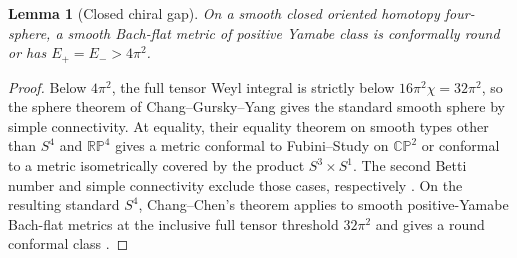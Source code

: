 \documentclass[11pt]{article}
\newtheorem{lemma}[theorem]{Lemma}
\theoremstyle{definition}
\theoremstyle{remark}
\begin{document}
\begin{lemma}[Closed chiral gap]\label{lem:closed-gap}
On a smooth closed oriented homotopy four-sphere, a smooth Bach-flat metric of positive Yamabe class is conformally round or has \(E_+=E_->4\pi^2\).
\end{lemma}
\begin{proof}
Below \(4\pi^2\), the full tensor Weyl integral is strictly below \(16\pi^2\chi=32\pi^2\), so the sphere theorem of Chang--Gursky--Yang gives the standard smooth sphere by simple connectivity. At equality, their equality theorem on smooth types other than \(S^4\) and \(\mathbb{RP}^4\) gives a metric conformal to Fubini--Study on \(\mathbb{CP}^2\) or conformal to a metric isometrically covered by the product \(S^3\times S^1\). The second Betti number and simple connectivity exclude those cases, respectively \cite[Theorems A and B]{ChangGurskyYang2003}. On the resulting standard \(S^4\), Chang--Chen's theorem applies to smooth positive-Yamabe Bach-flat metrics at the inclusive full tensor threshold \(32\pi^2\) and gives a round conformal class \cite[Remark 2 and Theorem 2.1]{ChangChen2021RicciSphere}.
\end{proof}
\end{document}
